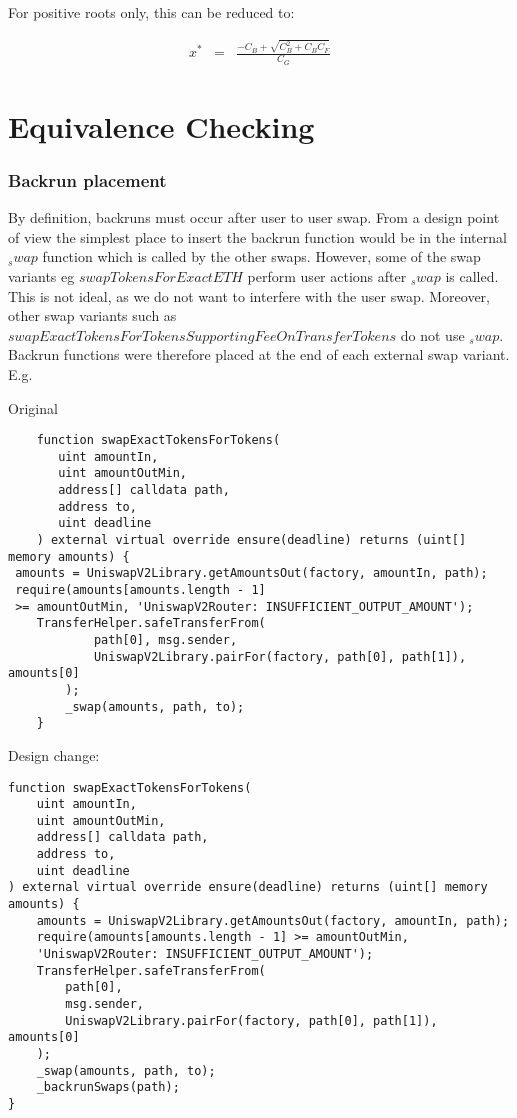 \documentclass[runningheads]{llncs}
\begin{document}
	For positive roots only, this can be reduced to:
	
	\begin{eqnarray}
		x^* &=& \frac{- C_{B} + \sqrt{C_{B} ^2 + C_{B} C_{F}}}{C_{G}} \label{eqn:sol2}
	\end{eqnarray}
	

\chapter{Equivalence Checking}

\subsection{Backrun placement}

By definition, backruns must occur after user to user swap. From a design point of view the simplest place to insert the backrun function would be in the internal $_swap$ function which is called by the other swaps. However, some of the swap variants eg $swapTokensForExactETH$ perform user actions after $_swap$ is called. This is not ideal, as we do not want to interfere with the user swap. Moreover, other swap variants such as $swapExactTokensForTokensSupportingFeeOnTransferTokens$ do not use $_swap$. Backrun functions were therefore placed at the end of each external swap variant. E.g.

Original
\label{Before swapExactTokensforTokens:1}
\begin{verbatim}
    function swapExactTokensForTokens(
       uint amountIn,
       uint amountOutMin,
       address[] calldata path,
       address to,
       uint deadline
    ) external virtual override ensure(deadline) returns (uint[] memory amounts) {
 amounts = UniswapV2Library.getAmountsOut(factory, amountIn, path);
 require(amounts[amounts.length - 1] 
 >= amountOutMin, 'UniswapV2Router: INSUFFICIENT_OUTPUT_AMOUNT');
    TransferHelper.safeTransferFrom(
            path[0], msg.sender, 
            UniswapV2Library.pairFor(factory, path[0], path[1]), amounts[0]
        );
        _swap(amounts, path, to);
    }
\end{verbatim}

Design change:

\label{After swapExactTokensforTokens:2}
\begin{verbatim}
function swapExactTokensForTokens(
    uint amountIn,
    uint amountOutMin,
    address[] calldata path,
    address to,
    uint deadline
) external virtual override ensure(deadline) returns (uint[] memory amounts) {
    amounts = UniswapV2Library.getAmountsOut(factory, amountIn, path);
    require(amounts[amounts.length - 1] >= amountOutMin, 
    'UniswapV2Router: INSUFFICIENT_OUTPUT_AMOUNT');
    TransferHelper.safeTransferFrom(
        path[0],
        msg.sender, 
        UniswapV2Library.pairFor(factory, path[0], path[1]), amounts[0]
    );
    _swap(amounts, path, to);
    _backrunSwaps(path);
}
\end{verbatim}
\end{document}
